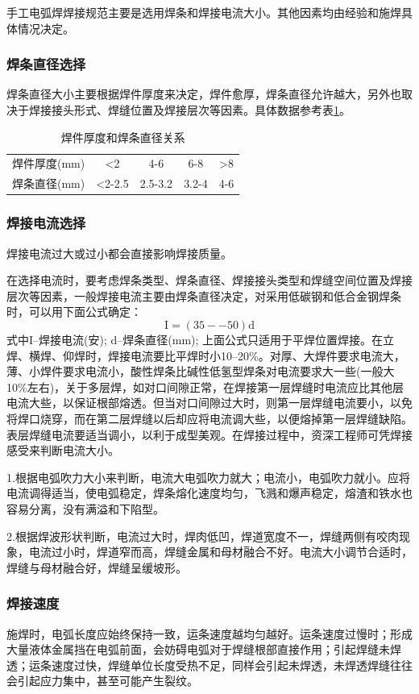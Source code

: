 \documentclass{ctexbook}
\begin{document}
手工电弧焊焊接规范主要是选用焊条和焊接电流大小。其他因素均由经验和施焊具体情况决定。
\subsubsection{焊条直径选择}
焊条直径大小主要根据焊件厚度来决定，焊件愈厚，焊条直径允许越大，另外也取决于焊接接头形式、焊缝位置及焊接层次等因素。具体数据参考表\ref{tab:hanjianhoudu}。
\begin{table}[htbp]
	\centering
	\caption{焊件厚度和焊条直径关系}
	\begin{tabular}{ccccc}
		焊件厚度(mm) & <2    & 4-6   & 6-8   & >8 \\
		焊条直径(mm) & <2-2.5 & 2.5-3.2 & 3.2-4 & 4-6 \\
	\end{tabular}%
	\label{tab:hanjianhoudu}%
\end{table}%
\subsubsection{焊接电流选择}
焊接电流过大或过小都会直接影响焊接质量。

在选择电流时，要考虑焊条类型、焊条直径、焊接接头类型和焊缝空间位置及焊接层次等因素，一般焊接电流主要由焊条直径决定，对采用低碳钢和低合金钢焊条时，可以用下面公式确定：
\begin{equation*}
	\text{I}=(35--50)\text{d}
\end{equation*}
式中I--焊接电流(安);
d--焊条直径(mm);
上面公式只适用于平焊位置焊接。在立焊、横焊、仰焊时，焊接电流要比平焊时小10--20\%。对厚、大焊件要求电流大，薄、小焊件要求电流小，酸性焊条比碱性低氢型焊条对电流要求大一些(一般大10\%左右)，关于多层焊，如对口间隙正常，在焊接第一层焊缝时电流应比其他层电流大些，以保证根部熔透。但当对口间隙过大时，则第一层焊缝电流要小，以免将焊口烧穿，而在第二层焊缝以后却应将电流调大些，以便熔掉第一层焊缝缺陷。表层焊缝电流要适当调小，以利于成型美观。在焊接过程中，资深工程师可凭焊接感受来判断电流大小。

1.根据电弧吹力大小来判断，电流大电弧吹力就大；电流小，电弧吹力就小。应将电流调得适当，使电弧稳定，焊条熔化速度均匀，飞溅和爆声稳定，熔渣和铁水也容易分离，没有满溢和下陷型。

2.根据焊波形状判断，电流过大时，焊肉低凹，焊道宽度不一，焊缝两侧有咬肉现象，电流过小时，焊道窄而高，焊缝金属和母材融合不好。电流大小调节合适时，焊缝与母材融合好，焊缝呈缓坡形。
\subsubsection{焊接速度}
施焊时，电弧长度应始终保持一致，运条速度越均匀越好。运条速度过慢时；形成大量液体金属挡在电弧前面，会妨碍电弧对于焊缝根部直接作用；引起焊缝未焊透；运条速度过快，焊缝单位长度受热不足，同样会引起未焊透，未焊透焊缝往往会引起应力集中，甚至可能产生裂纹。
\end{document}
